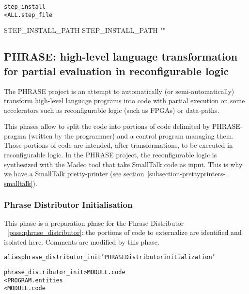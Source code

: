 \documentclass[a4paper]{report}
\newenvironment{PipsMake}{\begin{alltt}}{\end{alltt}}
\newcommand{\PipsPassRef}[1]{\texttt{\detokenize{#1}}~\ref{pass:#1}}
\newenvironment{PipsPass}[1]{\label{pass:#1}}{}
\begin{document}
\begin{PipsMake}
step_install
   < ALL.step_file
\end{PipsMake}

\begin{PipsProp}{STEP_INSTALL_PATH}
STEP_INSTALL_PATH ""
\end{PipsProp}



\subsection{PHRASE: high-level language transformation for partial evaluation in reconfigurable logic}
\label{subsubsection-phrase-code-distribution}

The PHRASE project is an attempt to automatically (or semi-automatically)
transform high-level language programs into code with partial execution on
some accelerators such as reconfigurable logic (such as FPGAs) or
data-paths.

This phases allow to split the code into portions of code delimited by
PHRASE-pragma (written by the programmer) and a control program managing
them. Those portions of code are intended, after transformations, to be
executed in reconfigurable logic. In the PHRASE project, the
reconfigurable logic is synthesized with the Madeo tool that take
SmallTalk code as input. This is why we have a SmallTalk pretty-printer
(see section~\ref{subsection-prettyprinters-smalltalk}).


\subsubsection{Phrase Distributor Initialisation}

\begin{PipsPass}{phrase_distributor_init}
This phase is a preparation phase for the Phrase Distributor
\PipsPassRef{phrase_distributor}: the portions of code to externalize are
identified and isolated here. Comments are modified by this phase.
\end{PipsPass}

\begin{PipsMake}
alias phrase_distributor_init 'PHRASE Distributor initialization'

phrase_distributor_init                  > MODULE.code
        < PROGRAM.entities
        < MODULE.code
\end{PipsMake}
\end{document}

